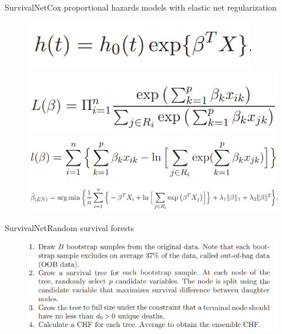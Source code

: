 \documentclass[
]{beamer}
\begin{document}
\begin{frame}[plain]{SurvivalNet}{Cox proportional hazards models with  elastic net regularization}
\begin{figure}
	\includegraphics[scale=0.5]{cox1}
	\includegraphics[scale=0.5]{cox2}
	\includegraphics[scale=0.5]{cox3}
	\includegraphics[scale=0.29]{cox4}
\end{figure}
\end{frame}

\begin{frame}[plain]{SurvivalNet}{Random survival forests}
\begin{figure}
	\includegraphics[scale=0.6]{rsf}
\end{figure}
\end{frame}
\end{document}

